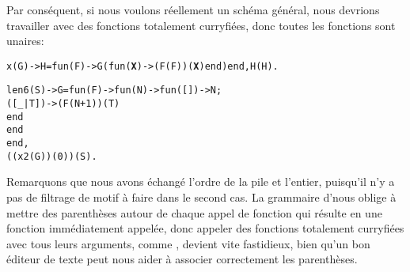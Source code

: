Par conséquent, si nous voulons réellement un schéma général, nous
devrions travailler avec des fonctions totalement curryfiées, donc
toutes les fonctions sont unaires:
\begin{alltt}
x(G) -> H = fun(F) -> G(fun(\textbf{X}) -> (F(F))(\textbf{X}) end) end, H(H).

len6(S) -> G=fun(F) -> fun(N) -> fun(   []) -> N;
                                    ([\_|T]) -> (F(N+1))(T)
                                 end
                       end
             end,
           ((x2(G))(0))(S).
\end{alltt}
Remarquons que nous avons échangé l'ordre de la pile et l'entier,
puisqu'il n'y a pas de filtrage de motif à faire dans le second
cas. La grammaire d'\Erlang nous oblige à mettre des parenthèses
autour de chaque appel de fonction qui résulte en une fonction
immédiatement appelée, donc appeler des fonctions totalement
curryfiées avec tous leurs arguments, comme ,
devient vite fastidieux, bien qu'un bon éditeur de texte peut nous
aider à associer correctement les parenthèses.

